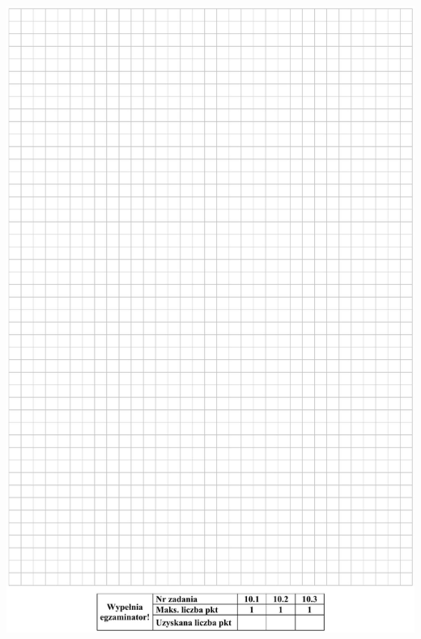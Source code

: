 \documentclass[10pt]{article}
\begin{document}
\includegraphics[max width=\textwidth, center]{2024_11_21_2f72fc0c2faed8928619g-15}
\end{document}

